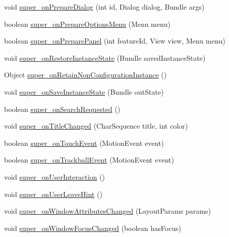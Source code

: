 \begin{DoxyCompactItemize}
\item 
void \hyperlink{classorg_1_1qtproject_1_1qt5_1_1android_1_1bindings_1_1_qt_activity_a385e763c50fd7d00213fe961bba46ed5}{super\-\_\-on\-Prepare\-Dialog} (int id, Dialog dialog, Bundle args)
\item 
boolean \hyperlink{classorg_1_1qtproject_1_1qt5_1_1android_1_1bindings_1_1_qt_activity_a9f7f63be6b9a75253b784e80bfa74f69}{super\-\_\-on\-Prepare\-Options\-Menu} (Menu menu)
\item 
boolean \hyperlink{classorg_1_1qtproject_1_1qt5_1_1android_1_1bindings_1_1_qt_activity_ab8af6f3b5a5b4547829dc68e7c31fd86}{super\-\_\-on\-Prepare\-Panel} (int feature\-Id, View view, Menu menu)
\item 
void \hyperlink{classorg_1_1qtproject_1_1qt5_1_1android_1_1bindings_1_1_qt_activity_a73303f1db92072963fe8592eb05b0258}{super\-\_\-on\-Restore\-Instance\-State} (Bundle saved\-Instance\-State)
\item 
Object \hyperlink{classorg_1_1qtproject_1_1qt5_1_1android_1_1bindings_1_1_qt_activity_a4fa6ba75523273de5b492052f1ae06f0}{super\-\_\-on\-Retain\-Non\-Configuration\-Instance} ()
\item 
void \hyperlink{classorg_1_1qtproject_1_1qt5_1_1android_1_1bindings_1_1_qt_activity_a8fb26c42bd8d7516bf863cc5fb50e287}{super\-\_\-on\-Save\-Instance\-State} (Bundle out\-State)
\item 
boolean \hyperlink{classorg_1_1qtproject_1_1qt5_1_1android_1_1bindings_1_1_qt_activity_a41f90d68a12b8140f7b0f4c4037c2567}{super\-\_\-on\-Search\-Requested} ()
\item 
void \hyperlink{classorg_1_1qtproject_1_1qt5_1_1android_1_1bindings_1_1_qt_activity_aa3982942fa042ca69a13ffbaff0ef403}{super\-\_\-on\-Title\-Changed} (Char\-Sequence title, int color)
\item 
boolean \hyperlink{classorg_1_1qtproject_1_1qt5_1_1android_1_1bindings_1_1_qt_activity_a216ec445b2cc31beac2032e38dd5e949}{super\-\_\-on\-Touch\-Event} (Motion\-Event event)
\item 
boolean \hyperlink{classorg_1_1qtproject_1_1qt5_1_1android_1_1bindings_1_1_qt_activity_a4ee363f63dfde917e450b70c8880fef9}{super\-\_\-on\-Trackball\-Event} (Motion\-Event event)
\item 
void \hyperlink{classorg_1_1qtproject_1_1qt5_1_1android_1_1bindings_1_1_qt_activity_a706d78309b31669959a98b46952de75c}{super\-\_\-on\-User\-Interaction} ()
\item 
void \hyperlink{classorg_1_1qtproject_1_1qt5_1_1android_1_1bindings_1_1_qt_activity_ae71ad183d13c1bbb1fd1dccee12dde24}{super\-\_\-on\-User\-Leave\-Hint} ()
\item 
void \hyperlink{classorg_1_1qtproject_1_1qt5_1_1android_1_1bindings_1_1_qt_activity_aa510558df5227f66d81d6119389e7886}{super\-\_\-on\-Window\-Attributes\-Changed} (Layout\-Params params)
\item 
void \hyperlink{classorg_1_1qtproject_1_1qt5_1_1android_1_1bindings_1_1_qt_activity_a3d01ed848c426f937fe18214ff006931}{super\-\_\-on\-Window\-Focus\-Changed} (boolean has\-Focus)
\end{DoxyCompactItemize}
